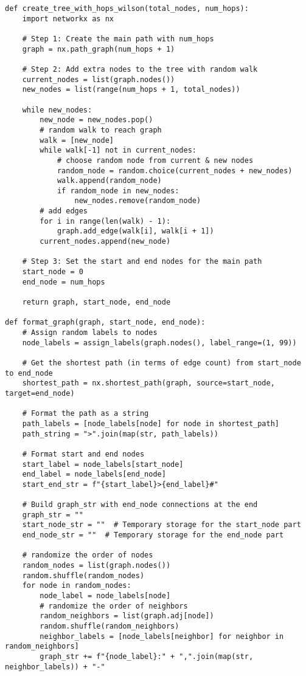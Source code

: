 \begin{listing}
\begin{verbatim}
def create_tree_with_hops_wilson(total_nodes, num_hops):
    import networkx as nx

    # Step 1: Create the main path with num_hops
    graph = nx.path_graph(num_hops + 1) 

    # Step 2: Add extra nodes to the tree with random walk
    current_nodes = list(graph.nodes())
    new_nodes = list(range(num_hops + 1, total_nodes))

    while new_nodes:
        new_node = new_nodes.pop()
        # random walk to reach graph
        walk = [new_node]
        while walk[-1] not in current_nodes:
            # choose random node from current & new nodes
            random_node = random.choice(current_nodes + new_nodes)
            walk.append(random_node)
            if random_node in new_nodes:
                new_nodes.remove(random_node)
        # add edges
        for i in range(len(walk) - 1):
            graph.add_edge(walk[i], walk[i + 1])
        current_nodes.append(new_node) 

    # Step 3: Set the start and end nodes for the main path
    start_node = 0
    end_node = num_hops

    return graph, start_node, end_node

def format_graph(graph, start_node, end_node):
    # Assign random labels to nodes
    node_labels = assign_labels(graph.nodes(), label_range=(1, 99))
    
    # Get the shortest path (in terms of edge count) from start_node to end_node
    shortest_path = nx.shortest_path(graph, source=start_node, target=end_node)

    # Format the path as a string
    path_labels = [node_labels[node] for node in shortest_path]
    path_string = ">".join(map(str, path_labels))
    
    # Format start and end nodes
    start_label = node_labels[start_node]
    end_label = node_labels[end_node]
    start_end_str = f"{start_label}>{end_label}#"

    # Build graph_str with end_node connections at the end
    graph_str = ""
    start_node_str = ""  # Temporary storage for the start_node part
    end_node_str = ""  # Temporary storage for the end_node part
    
    # randomize the order of nodes
    random_nodes = list(graph.nodes())
    random.shuffle(random_nodes)
    for node in random_nodes:
        node_label = node_labels[node]
        # randomize the order of neighbors
        random_neighbors = list(graph.adj[node])
        random.shuffle(random_neighbors)
        neighbor_labels = [node_labels[neighbor] for neighbor in random_neighbors]
        graph_str += f"{node_label}:" + ",".join(map(str, neighbor_labels)) + "-"


\end{verbatim}
\end{listing}

